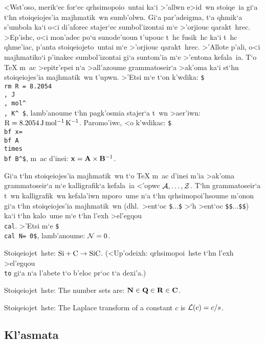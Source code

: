 <Wst'oso, merik`ec for`ec qrhsimopoio~untai ka`i >'allwn e>id~wn
stoiqe~ia gi`a t`hn stoiqeiojes'ia majhmatik~wn sumb'olwn.  Gi`a
par'adeigma, t`a qhmik`a s'umbola ka`i o<i di'aforec stajer`ec
sumbol'izontai m`e >'orjiouc qarakt~hrec.  >Ep'ishc, o<i mon'adec po`u
sunode'uoun t'upouc t~hc fusik~hc ka`i t~hc qhme'iac, p'anta
stoiqeiojeto~untai m`e >'orjiouc qarakt~hrec.  >'Allote p'ali, o<i
majhmatiko`i p'inakec sumbol'izontai gi`a suntom'ia m`e >'entona
kefala~ia. T`o {\rm\TeX} m~ac >epitr'epei n`a >all'azoume grammatoseir`a
>ak'oma ka`i st`hn stoiqeiojes'ia majhmatik~wn t'upwn.  >'Etsi m`e t`on
k'wdika: {\tt\$\\rm R = 8.2054\\, J\\, mol\^{}\rb\\, K\^{}\rb
\$}, lamb'anoume t`hn pagk'osmia sta\-je\-r`a t~wn >aer'iwn: $\rm R =
8.2054\, J\, mol^{-1}\,K^{-1}$\null.  Paromo'iwc, <o k'wdikac:
{\tt\$\lb\\bf x\rb =  \lb\\bf A\rb \\times \lb\\bf B\rb\^{}\rb\$},
m~ac d'inei:  ${\bf x} = {\bf A} \times {\bf B}^{-1}$.

Gi`a t`hn stoiqeiojes'ia majhmatik~wn t`o {\rm\TeX} m~ac d'inei m'ia
>ak'oma grammatoseir`a m`e kalligrafik`a kefala~ia <'opwc ${\cal A},
\ldots, {\cal Z}$\null. T`hn grammatoseir`a t~wn kalligrafik~wn
kefala'iwn mporo~ume n`a t`hn qrhsimopoi'hsoume {\tengs m'onon\/} gi`a
t`hn stoiqeiojes'ia majhmatik~wn (dhl.\ >ent`oc {\tt\$$\ldots$\$}
>`h >ent`oc {\tt\$\$$\ldots$\$\$}) ka`i t`hn kalo~ume m`e t`hn l'exh
>el'egqou {\tt\\cal}.  >'Etsi m`e {\tt\$\lb\\cal N\rb = 0\rb\$},
lamb'anoume: ${\cal N} = 0$.

\exercise Stoiqeiojet~hste: $\rm Si + C \to SiC$\null. (<Up'odeixh:
qrhsimopoi~hste t`hn l'exh >el'egqou {\tt\\to} gi`a n`a l'abete t`o
b'eloc pr`oc t`a dexi'a.)

\exercise Stoiqeiojet~hste: {\rm The number sets are: $\bf N
\in Q \in R \in C$.}

\exercise Stoiqeiojet~hste: {\rm The Laplace transform of a constant $c$
is ${\cal L} (c) = c / s$.}


\subsection{Kl'asmata}

